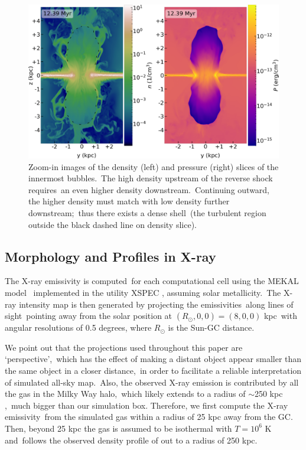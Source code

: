 \documentclass[fleqn,usenatbib,useAMS]{mnras}
\begin{document}
  \begin{figure}
    \includegraphics[width=\columnwidth]{figures/fig__innerbubbles.png}
    \caption{
       Zoom-in images of the density (left) and pressure (right) slices of the innermost bubbles.\
       The high density upstream of the reverse shock requires\
       an even higher density downstream.\
       Continuing outward, the higher density must match with low density further downstream;\
       thus there exists a dense shell\
       (the turbulent region outside the black dashed line on density slice).
     }
    \label{fig__innerbubbles}
  \end{figure}

  \subsection{Morphology and Profiles in X-ray}
  \label{X-ray}
  The X-ray emissivity is computed\
  for each computational cell
  using the MEKAL model \citep{Xray-1,Xray-2,Xray-3}\
  implemented in the utility XSPEC \citep{XSPEC}, assuming solar metallicity.\
  The X-ray intensity map is then generated by projecting the emissivities\
  along lines of sight\
  pointing away from the solar position at $(R_{\odot},0,0)=(8,0,0)$ kpc\
  with angular resolutions of 0.5 degrees, where $R_{\odot}$ is the Sun-GC distance.

  We point out that the projections used throughout this paper are \lq perspective\rq,\
  which has the effect of making a distant object appear smaller than the same object in a closer distance,\
  in order to facilitate a reliable interpretation of simulated all-sky map.\
  Also, the observed X-ray emission is contributed by all the gas in the Milky Way halo,\
  which likely extends to a radius of $\sim$250 kpc \citep{halo-radius-1,halo-radius-2},\
  much bigger than our simulation box. Therefore, we first compute the X-ray emissivity\
  from the simulated gas within a radius of 25 kpc away from the GC.
  Then, beyond 25 kpc the gas is assumed to be isothermal with $T=10^6$ K and\
  follows the observed density profile of \citep{temperature-MW} out to a radius of 250 kpc.
\end{document}
